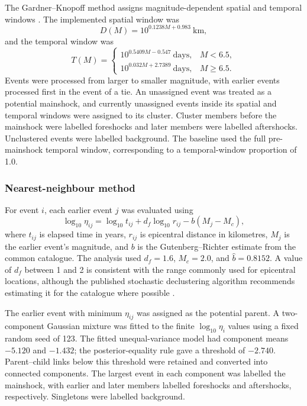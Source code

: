 The Gardner--Knopoff method assigns magnitude-dependent spatial and temporal
windows \citep{gardner1974,vanstiphout2012}. The implemented spatial window
was
\[
D(M)=10^{0.1238M+0.983}\ \mathrm{km},
\]
and the temporal window was
\[
T(M)=
\begin{cases}
10^{0.5409M-0.547}\ \mathrm{days}, & M<6.5,\\
10^{0.032M+2.7389}\ \mathrm{days}, & M\geq6.5.
\end{cases}
\]
Events were processed from larger to smaller magnitude, with earlier events
processed first in the event of a tie. An unassigned event was treated as a
potential mainshock, and currently unassigned events inside its spatial and
temporal windows were assigned to its cluster. Cluster members before the
mainshock were labelled foreshocks and later members were labelled
aftershocks. Unclustered events were labelled background. The baseline used
the full pre-mainshock temporal window, corresponding to a temporal-window
proportion of 1.0.

\subsubsection{Nearest-neighbour method}

For event $i$, each earlier event $j$ was evaluated using
\[
\log_{10}\eta_{ij}
=\log_{10}t_{ij}
+d_f\log_{10}r_{ij}
-b(M_j-M_c),
\]
where $t_{ij}$ is elapsed time in years, $r_{ij}$ is epicentral distance in
kilometres, $M_j$ is the earlier event's magnitude, and $b$ is the
Gutenberg--Richter estimate from the common catalogue. The analysis used
$d_f=1.6$, $M_c=2.0$, and $\hat b=0.8152$. A value of $d_f$ between 1 and 2
is consistent with the range commonly used for epicentral locations, although
the published stochastic declustering algorithm recommends estimating it for
the catalogue where possible \citep{zaliapin2020declustering}.

The earlier event with minimum $\eta_{ij}$ was assigned as the potential
parent. A two-component Gaussian mixture was fitted to the finite
$\log_{10}\eta_i$ values using a fixed random seed of 123. The fitted
unequal-variance model had component means $-5.120$ and $-1.432$; the
posterior-equality rule gave a threshold of $-2.740$. Parent--child links
below this threshold were retained and converted into connected components.
The largest event in each component was labelled the mainshock, with earlier
and later members labelled foreshocks and aftershocks, respectively.
Singletons were labelled background.

